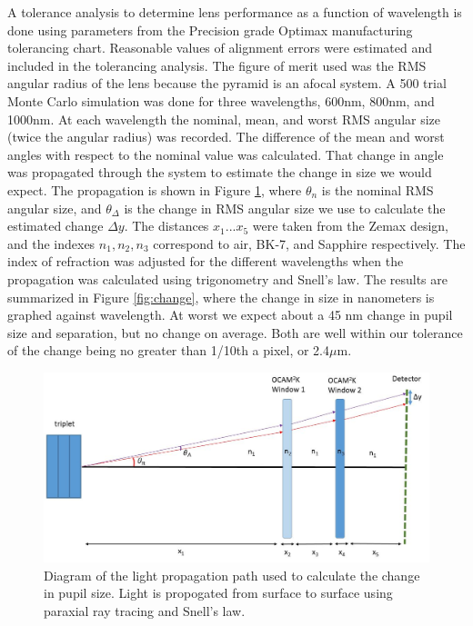 A tolerance analysis to determine lens performance as a function of wavelength is done using parameters from the Precision grade Optimax manufacturing tolerancing chart. Reasonable values of alignment errors were estimated and included in the tolerancing analysis. The figure of merit used was the RMS angular radius of the lens because the pyramid is an afocal system. A 500 trial Monte Carlo simulation was done for three wavelengths, 600nm, 800nm, and 1000nm. At each wavelength the nominal, mean, and worst RMS angular size (twice the angular radius) was recorded. The difference of the mean and worst angles with respect to the nominal value was calculated. That change in angle was propagated through the system to estimate the change in size we would expect. The propagation is shown in Figure \ref{fig:propagation}, where $\theta_n$ is the nominal RMS angular size, and $\theta_\Delta$ is the change in RMS angular size we use to calculate the estimated change $\Delta y$. The distances $x_1 ... x_5$ were taken from the Zemax design, and the indexes $n_1, n_2, n_3$ correspond to air, BK-7, and Sapphire respectively. The index of refraction was adjusted for the different wavelengths when the propagation was calculated using trigonometry and Snell's law. The results are summarized in Figure \ref{fig:change}, where the change in size in nanometers is graphed against wavelength. At worst we expect about a 45 nm change in pupil size and separation, but no change on average. Both are well within our tolerance of the change being no greater than 1/10th a pixel, or 2.4$\mu$m.
	
	
	
\begin{figure}[h]
	\centering
	\includegraphics[width=.8\textwidth]{Chapter Materials/Chapter Three Materials/propagation.JPG}
	\caption{Diagram of the light propagation path used to calculate the change in pupil size. Light is propogated from surface to surface using paraxial ray tracing and Snell's law.}
	\label{fig:propagation}
\end{figure}
	
